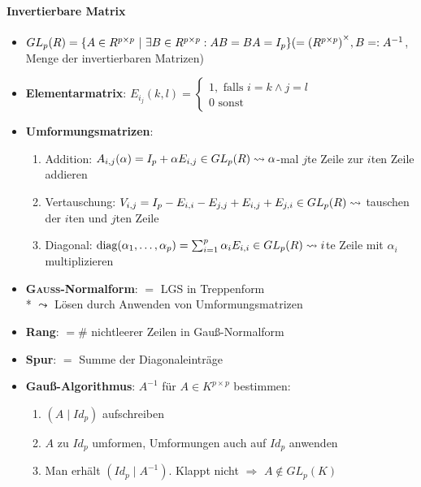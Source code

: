 \paragraph{Invertierbare Matrix}
\begin{itemize}
  \item $ GL_p(R) =\{ A \in R^{p \times p}\ |\  \exists B \in R^{p \times p} : AB=BA=I_p \} \\* (={(R^{p \times p})}^{\times}, B=:A^{-1}$, Menge der invertierbaren Matrizen)
  \item \textbf{Elementarmatrix}: $E_{i_j}(k,l)=\begin{cases} 1, \text{ falls } i=k \wedge j=l \\ 0 \text{ sonst} \end{cases}$
  \item \textbf{Umformungsmatrizen}:
  \begin{enumerate}
    \item Addition: $A_{i,j}(\alpha)=I_p+\alpha E_{i,j} \in GL_p(R) \\* \leadsto \alpha$-mal $j$te Zeile zur $i$ten Zeile addieren
    \item Vertauschung: $V_{i,j}=I_p-E_{i,i}-E_{j,j}+E_{i,j}+E_{j,i} \in GL_p(R) \\* \leadsto$ tauschen der $i$ten und $j$ten Zeile
    \item Diagonal: $\text{diag}(\alpha_1,\dots,\alpha_p)=\sum_{i=1}^p \alpha_i E_{i,i} \in GL_p(R) \\* \leadsto i$te Zeile mit $\alpha_i$ multiplizieren
  \end{enumerate}
  \item \textbf{\textsc{Gauß}-Normalform}: $=$ LGS in Treppenform \\*
      $\leadsto$ Lösen durch Anwenden von Umformungsmatrizen
  \item \textbf{Rang}: $= \#$ nichtleerer Zeilen in Gauß-Normalform
  \item \textbf{Spur}: $=$ Summe der Diagonaleinträge
  \item \textbf{Gauß-Algorithmus}: $A^{-1}$ für $A \in K^{p \times p}$ bestimmen:
  \begin{enumerate}
    \item $(A \mid Id_p)$ aufschreiben
    \item $A$ zu $Id_p$ umformen, Umformungen auch auf $Id_p$ anwenden
    \item Man erhält $(Id_p \mid A^{-1})$. Klappt nicht $\Rightarrow$ $A \not \in GL_p(K)$
  \end{enumerate}

\end{itemize}
